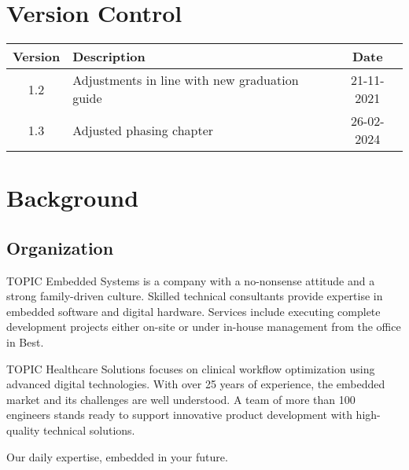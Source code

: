 \documentclass{article}
\begin{document}
\newpage

\section*{Version Control}

\begin{tabular}{|c|l|c|}
    \hline
    Version & Description & Date \\
    \hline
    1.2 & Adjustments in line with new graduation guide & 21-11-2021 \\
    1.3 & Adjusted phasing chapter & 26-02-2024 \\
    \hline
\end{tabular}

\newpage

\tableofcontents

\newpage
\section{Background}

\subsection{Organization}
TOPIC Embedded Systems is a company with a no-nonsense attitude and a strong
family-driven culture. Skilled technical consultants provide expertise in
embedded software and digital hardware. Services include executing complete
development projects either on-site or under in-house management from the office
in Best.

TOPIC Healthcare Solutions focuses on clinical workflow optimization using
advanced digital technologies. With over 25 years of experience, the embedded
market and its challenges are well understood. A team of more than 100 engineers
stands ready to support innovative product development with high-quality
technical solutions.

Our daily expertise, embedded in your future.
\end{document}
